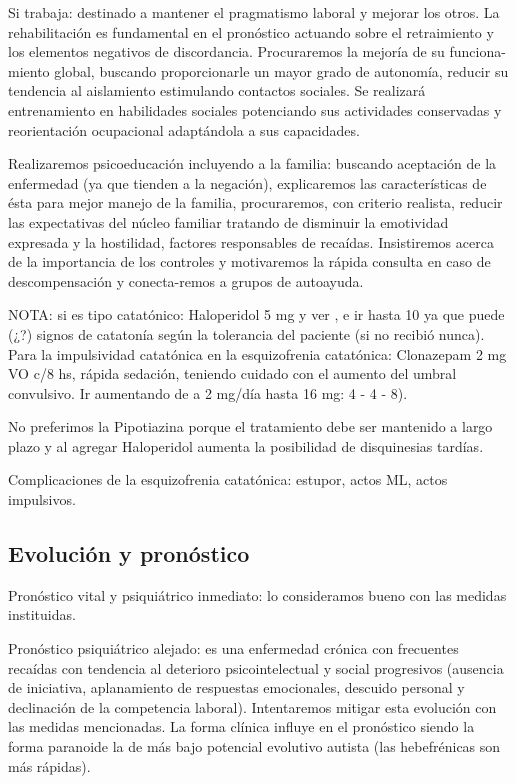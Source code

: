 Si trabaja: destinado a mantener el pragmatismo laboral y mejorar los otros. La rehabilitación es fundamental en el pronóstico actuando sobre el retraimiento y los elementos negativos de discordancia. Procuraremos la mejoría de su funciona-miento global, buscando proporcionarle un mayor grado de autonomía, reducir su tendencia al aislamiento estimulando contactos sociales. Se realizará entrenamiento en habilidades sociales potenciando sus actividades conservadas y reorientación ocupacional adaptándola a sus capacidades.

Realizaremos psicoeducación incluyendo a la familia: buscando aceptación de la enfermedad (ya que tienden a la negación), explicaremos las características de ésta para mejor manejo de la familia, procuraremos, con criterio realista, reducir las expectativas del núcleo familiar tratando de disminuir la emotividad expresada y la hostilidad, factores responsables de recaídas. Insistiremos acerca de la importancia de los controles y motivaremos la rápida consulta en caso de descompensación y conecta-remos a grupos de autoayuda.

NOTA: si es tipo catatónico: Haloperidol 5 mg y ver , e ir hasta 10 ya que puede (¿?) signos de catatonía según la tolerancia del paciente (si no recibió nunca). Para la impulsividad catatónica en la esquizofrenia catatónica: Clonazepam 2 mg VO c/8 hs, rápida sedación, teniendo cuidado con el aumento del umbral convulsivo. Ir aumentando de a 2 mg/día hasta 16 mg: 4 - 4 - 8).

No preferimos la Pipotiazina porque el tratamiento debe ser mantenido a largo plazo y al agregar Haloperidol aumenta la posibilidad de disquinesias tardías.

Complicaciones de la esquizofrenia catatónica: estupor, actos ML, actos impulsivos.
\subsection*{Evolución y pronóstico}
Pronóstico vital y psiquiátrico inmediato: lo consideramos bueno con las medidas instituidas.

Pronóstico psiquiátrico alejado: es una enfermedad crónica con frecuentes recaídas con tendencia al deterioro psicointelectual y social progresivos (ausencia de iniciativa, aplanamiento de respuestas emocionales, descuido personal y declinación de la competencia laboral). Intentaremos mitigar esta evolución con las medidas mencionadas. La forma clínica influye en el pronóstico siendo la forma paranoide la de más bajo potencial evolutivo autista (las hebefrénicas son más rápidas).

